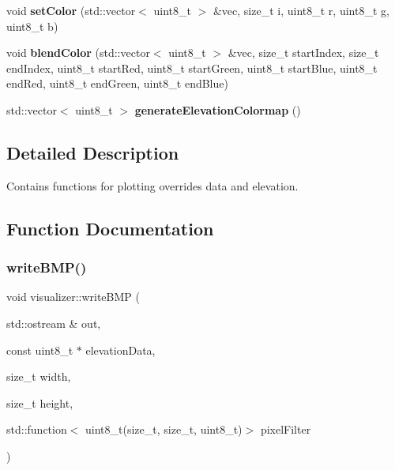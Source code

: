 \begin{DoxyCompactItemize}
void {\bfseries set\+Color} (std\+::vector$<$ uint8\+\_\+t $>$ \&vec, size\+\_\+t i, uint8\+\_\+t r, uint8\+\_\+t g, uint8\+\_\+t b)
\item 
\mbox{\label{namespacevisualizer_a627bff4c6bfe19982566020c2af63497}} 
void {\bfseries blend\+Color} (std\+::vector$<$ uint8\+\_\+t $>$ \&vec, size\+\_\+t start\+Index, size\+\_\+t end\+Index, uint8\+\_\+t start\+Red, uint8\+\_\+t start\+Green, uint8\+\_\+t start\+Blue, uint8\+\_\+t end\+Red, uint8\+\_\+t end\+Green, uint8\+\_\+t end\+Blue)
\item 
\mbox{\label{namespacevisualizer_a6fd4dbb10bbd0b71f19af0e1806f5836}} 
std\+::vector$<$ uint8\+\_\+t $>$ {\bfseries generate\+Elevation\+Colormap} ()
\end{DoxyCompactItemize}


\subsection{Detailed Description}
Contains functions for plotting overrides data and elevation. 

\subsection{Function Documentation}
\mbox{\label{namespacevisualizer_ab4e649cd7413a51ac1ae4b31a2994c3a}} 
\subsubsection{\texorpdfstring{write\+B\+M\+P()}{writeBMP()}}
{\footnotesize\ttfamily void visualizer\+::write\+B\+MP (\begin{DoxyParamCaption}\item[{std\+::ostream \&}]{out,  }\item[{const uint8\+\_\+t $\ast$}]{elevation\+Data,  }\item[{size\+\_\+t}]{width,  }\item[{size\+\_\+t}]{height,  }\item[{std\+::function$<$ uint8\+\_\+t(size\+\_\+t, size\+\_\+t, uint8\+\_\+t)$>$}]{pixel\+Filter }\end{DoxyParamCaption})}

